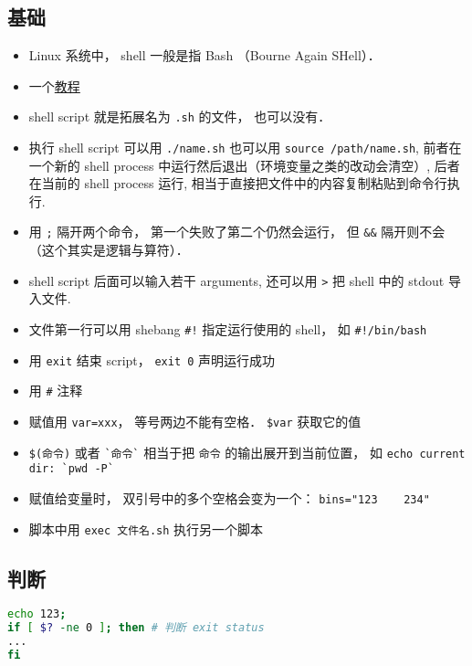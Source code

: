 
\begin{issues}
\issueDraft
\end{issues}


\subsection{基础}
\begin{itemize}
\item Linux 系统中， shell 一般是指 Bash （Bourne Again SHell）．
\item 一个\href{https://tldp.org/LDP/abs/html/why-shell.html}{教程}
\item shell script 就是拓展名为 \verb`.sh` 的文件， 也可以没有．
\item 执行 shell script 可以用 \verb`./name.sh` 也可以用 \verb`source /path/name.sh`, 前者在一个新的 shell process 中运行然后退出（环境变量之类的改动会清空）, 后者在当前的 shell process 运行, 相当于直接把文件中的内容复制粘贴到命令行执行.
\item 用 \verb|;| 隔开两个命令， 第一个失败了第二个仍然会运行， 但 \verb|&&| 隔开则不会（这个其实是逻辑与算符）．
\item shell script 后面可以输入若干 arguments, 还可以用 \verb`>` 把 shell 中的 stdout 导入文件.
\item 文件第一行可以用 shebang \verb`#!` 指定运行使用的 shell， 如 \verb`#!/bin/bash`
\item 用 \verb|exit| 结束 script， \verb`exit 0` 声明运行成功
\item 用 \verb`#` 注释
\item 赋值用 \verb`var=xxx`， 等号两边不能有空格． \verb|$var| 获取它的值
\item \verb|$(命令)| 或者 \verb|`命令`| 相当于把 \verb|命令| 的输出展开到当前位置， 如 \verb|echo current dir: `pwd -P`|
\item 赋值给变量时， 双引号中的多个空格会变为一个： \verb|bins="123    234"|
\item 脚本中用 \verb|exec 文件名.sh| 执行另一个脚本
\end{itemize}

\subsection{判断}
\begin{lstlisting}[language=bash]
echo 123;
if [ $? -ne 0 ]; then # 判断 exit status
...
fi
\end{lstlisting}

